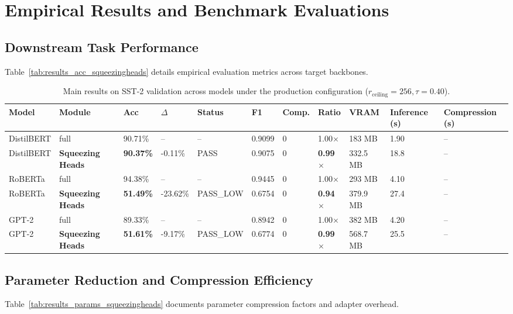 \section{Empirical Results and Benchmark Evaluations}

\subsection{Downstream Task Performance}
Table~\ref{tab:results_acc_squeezingheads} details empirical evaluation metrics across target backbones.

\begin{table}[t]
\centering
\small
\begin{tabular}{lllllllllll}
\toprule
\textbf{Model} & \textbf{Module} & \textbf{Acc} & \textbf{$\Delta$} & \textbf{Status} & \textbf{F1} & \textbf{Comp.} & \textbf{Ratio} & \textbf{VRAM} & \textbf{Inference (s)} & \textbf{Compression (s)} \\
\midrule
DistilBERT & full & 90.71\% & -- & -- & 0.9099 & 0 & 1.00$\times$ & 183 MB & 1.90 & -- \\
DistilBERT & \textbf{Squeezing Heads} & \textbf{90.37\%} & -0.11\% & PASS & 0.9075 & 0 & \textbf{0.99$\times$} & 332.5 MB & 18.8 & -- \\
RoBERTa & full & 94.38\% & -- & -- & 0.9445 & 0 & 1.00$\times$ & 293 MB & 4.10 & -- \\
RoBERTa & \textbf{Squeezing Heads} & \textbf{51.49\%} & -23.62\% & PASS\_LOW & 0.6754 & 0 & \textbf{0.94$\times$} & 379.9 MB & 27.4 & -- \\
GPT-2 & full & 89.33\% & -- & -- & 0.8942 & 0 & 1.00$\times$ & 382 MB & 4.20 & -- \\
GPT-2 & \textbf{Squeezing Heads} & \textbf{51.61\%} & -9.17\% & PASS\_LOW & 0.6774 & 0 & \textbf{0.99$\times$} & 568.7 MB & 25.5 & -- \\
\bottomrule
\end{tabular}
\caption{Main results on SST-2 validation across models under the production configuration ($r_{\mathrm{ceiling}}=256, \tau=0.40$).}
\label{tab:main_sst2}
\end{table}

\subsection{Parameter Reduction and Compression Efficiency}
Table~\ref{tab:results_params_squeezingheads} documents parameter compression factors and adapter overhead.

